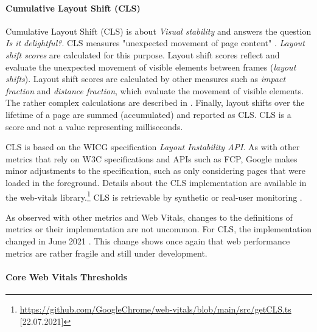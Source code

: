 
\paragraph{Cumulative Layout Shift (CLS)} %

Cumulative Layout Shift (CLS) is about \textit{Visual stability} and answers the question \textit{Is it delightful?}.
CLS measures "unexpected movement of page content" \cite{2020WaltonCLS}.
\textit{Layout shift scores} are calculated for this purpose.
Layout shift scores reflect and evaluate the unexpected movement of visible elements between frames (\textit{layout shifts}).
Layout shift scores are calculated by other measures such as \textit{impact fraction} and \textit{distance fraction}, which evaluate the movement of visible elements.
The rather complex calculations are described in \cite{2020WaltonCLS}.
Finally, layout shifts over the lifetime of a page are summed (accumulated) and reported as CLS.
CLS is a score and not a value representing milliseconds.

CLS is based on the WICG specification \textit{Layout Instability API}.
As with other metrics that rely on W3C specifications and APIs such as FCP, Google makes minor adjustments to the specification, such as only considering pages that were loaded in the foreground.
Details about the CLS implementation are available in the web-vitals library.\footnote{\url{https://github.com/GoogleChrome/web-vitals/blob/main/src/getCLS.ts} [22.07.2021]}
CLS is retrievable by synthetic or real-user monitoring \cite{2020WaltonCLS}.


As observed with other metrics and Web Vitals, changes to the definitions of metrics or their implementation are not uncommon.
For CLS, the implementation changed in June 2021 \cite{2021Sullivan}.
This change shows once again that web performance metrics are rather fragile and still under development.




\paragraph{Core Web Vitals Thresholds} %

